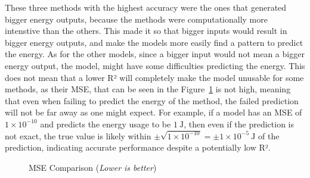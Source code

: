 These three methods with the highest accuracy were the ones that generated bigger energy outputs, because the methods were computationally more intenstive than the others. This made it so that bigger inputs would result in bigger energy outputs, and make the models more easily find a pattern to predict the energy. As for the other models, since a bigger input would not mean a bigger energy output, the model, might have some difficulties predicting the energy. This does not mean that a lower R² will completely make the model unusable for some methods, as their MSE, that can be seen in the Figure~\ref{fig:mse_comparison} is not high, meaning that even when failing to predict the energy of the method, the failed prediction will not be far away as one might expect. For example, if a model has an MSE of $1 \times 10^{-10}$ and predicts the energy usage to be $1~\mathrm{J}$, then even if the prediction is not exact, the true value is likely within $\pm \sqrt{1 \times 10^{-10}} = \pm 1 \times 10^{-5}~\mathrm{J}$ of the prediction, indicating accurate performance despite a potentially low R². 

\begin{figure}[htbp]
  \centering
  \caption{MSE Comparison (\textit{Lower is better})}
  \label{fig:mse_comparison}
\end{figure}

